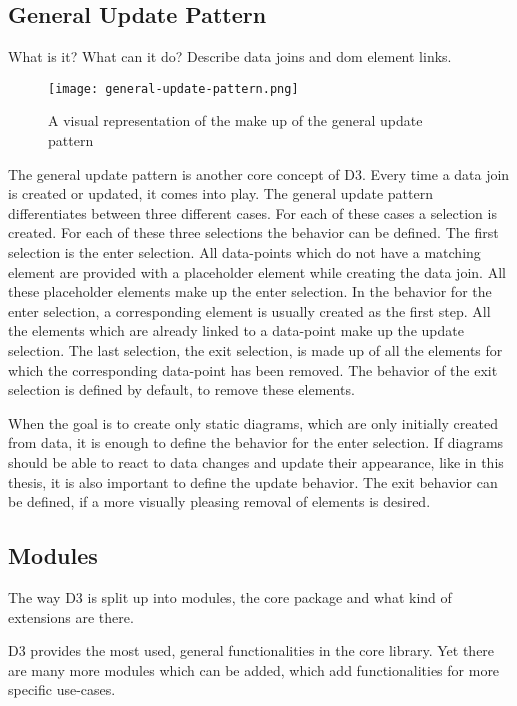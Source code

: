 \subsection{General Update Pattern}
What is it? What can it do? Describe data joins and dom element links.

\begin{figure}
    \label{fig:general-update-pattern}
    \texttt{[image: general-update-pattern.png]}
    \caption[general-update-pattern]{A visual representation of the make up of the general update pattern\cite{bostock_2012}}
\end{figure}

The general update pattern is another core concept of D3. Every time a data join is created or updated, it comes into play. The general update pattern differentiates between three different cases. For each of these cases a selection is created. For each of these three selections the behavior can be defined. The first selection is the enter selection. All data-points which do not have a matching element are provided with a placeholder element while creating the data join. All these placeholder elements make up the enter selection. In the behavior for the enter selection, a corresponding element is usually created as the first step. All the elements which are already linked to a data-point make up the update selection. The last selection, the exit selection, is made up of all the elements for which the corresponding data-point has been removed. The behavior of the exit selection is defined by default, to remove these elements.

When the goal is to create only static diagrams, which are only initially created from data, it is enough to define the behavior for the enter selection. If diagrams should be able to react to data changes and update their appearance, like in this thesis, it is also important to define the update behavior. The exit behavior can be defined, if a more visually pleasing removal of elements is desired.


\subsection{Modules}
The way D3 is split up into modules, the core package and what kind of extensions are there.

D3 provides the most used, general functionalities in the core library. Yet there are many more modules which can be added, which add functionalities for more specific use-cases.
